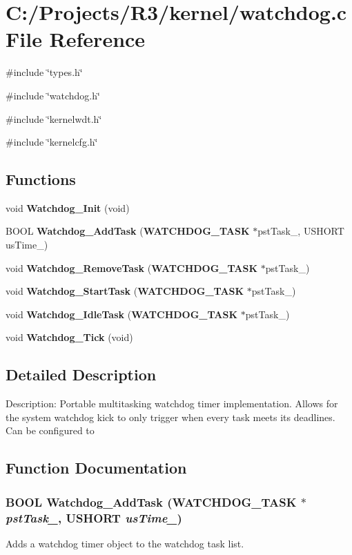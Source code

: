 \section{C:/Projects/R3/kernel/watchdog.c File Reference}
\label{watchdog_8c}
{\ttfamily \#include \char`\"{}types.h\char`\"{}}\par
{\ttfamily \#include \char`\"{}watchdog.h\char`\"{}}\par
{\ttfamily \#include \char`\"{}kernelwdt.h\char`\"{}}\par
{\ttfamily \#include \char`\"{}kernelcfg.h\char`\"{}}\par
\subsection*{Functions}
\begin{DoxyCompactItemize}
\item 
void {\bf Watchdog\_\-Init} (void)
\item 
BOOL {\bf Watchdog\_\-AddTask} ({\bf WATCHDOG\_\-TASK} $\ast$pstTask\_\-, USHORT usTime\_\-)
\item 
void {\bf Watchdog\_\-RemoveTask} ({\bf WATCHDOG\_\-TASK} $\ast$pstTask\_\-)
\item 
void {\bf Watchdog\_\-StartTask} ({\bf WATCHDOG\_\-TASK} $\ast$pstTask\_\-)
\item 
void {\bf Watchdog\_\-IdleTask} ({\bf WATCHDOG\_\-TASK} $\ast$pstTask\_\-)
\item 
void {\bf Watchdog\_\-Tick} (void)
\end{DoxyCompactItemize}


\subsection{Detailed Description}
Description: Portable multitasking watchdog timer implementation. Allows for the system watchdog kick to only trigger when every task meets its deadlines. Can be configured to 

\subsection{Function Documentation}
\subsubsection[{Watchdog\_\-AddTask}]{\setlength{\rightskip}{0pt plus 5cm}BOOL Watchdog\_\-AddTask ({\bf WATCHDOG\_\-TASK} $\ast$ {\em pstTask\_\-}, \/  USHORT {\em usTime\_\-})}\label{watchdog_8c_af3e84ded0a01c20b8577881423547211}
Adds a watchdog timer object to the watchdog task list.


